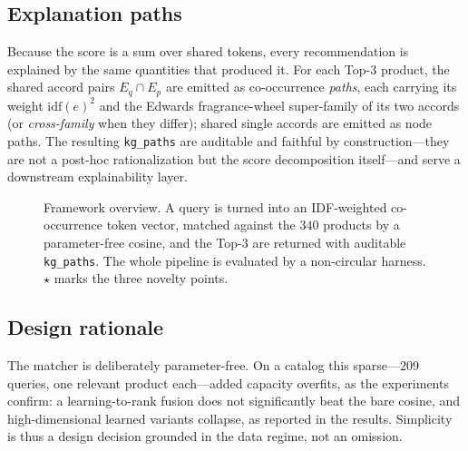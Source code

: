 \documentclass[conference]{IEEEtran}
\begin{document}
\subsection{Explanation paths}
Because the score is a sum over shared tokens, every recommendation is explained by the
same quantities that produced it. For each Top-3 product, the shared accord pairs
$E_q\cap E_p$ are emitted as co-occurrence \emph{paths}, each carrying its weight
$\mathrm{idf}(e)^2$ and the Edwards fragrance-wheel super-family \cite{r10} of its two
accords (or \textit{cross-family} when they differ); shared single accords are emitted
as node paths. The resulting \texttt{kg\_paths} are auditable and faithful by
construction---they are not a post-hoc rationalization but the score decomposition
itself---and serve a downstream explainability layer.

\begin{figure}[t]
\centering
{}
\caption{Framework overview. A query is turned into an IDF-weighted co-occurrence token
vector, matched against the $340$ products by a parameter-free cosine, and the Top-3 are
returned with auditable \texttt{kg\_paths}. The whole pipeline is evaluated by a
non-circular harness. $\star$ marks the three novelty points.}
\label{fig:arch}
\end{figure}

\subsection{Design rationale}
The matcher is deliberately parameter-free. On a catalog this sparse---$209$ queries,
one relevant product each---added capacity overfits, as the experiments confirm: a
learning-to-rank fusion does not significantly beat the bare cosine, and high-dimensional
learned variants collapse, as reported in the results. Simplicity is thus a design
decision grounded in the data regime, not an omission.
\end{document}

